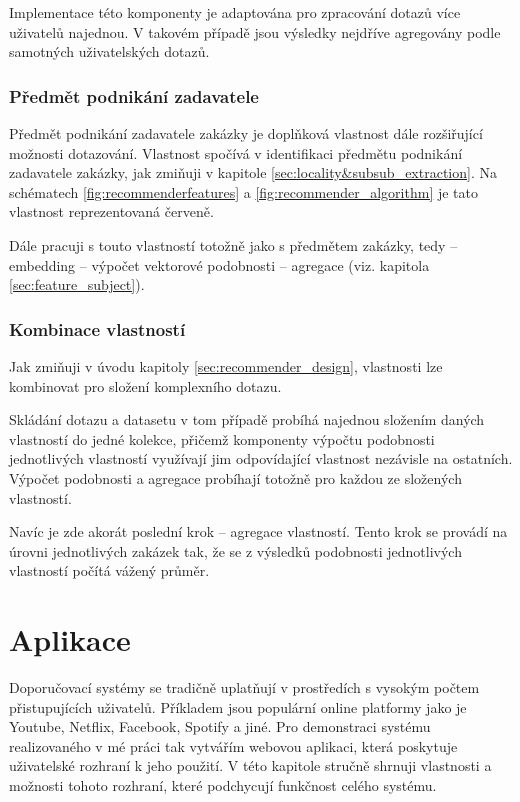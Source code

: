 \documentclass[thesis=M,czech]{FITthesis}[2019/12/23]
\begin{document}
Implementace této komponenty je adaptována pro zpracování dotazů více uživatelů najednou. V takovém případě jsou výsledky nejdříve agregovány podle samotných uživatelských dotazů.


\subsection{Předmět podnikání zadavatele}
\label{sec:feature_entity_subject}

Předmět podnikání zadavatele zakázky je doplňková vlastnost dále rozšiřující možnosti dotazování. Vlastnost spočívá v identifikaci předmětu podnikání zadavatele zakázky, jak zmiňuji v kapitole \ref{sec:locality&subsub_extraction}. Na schématech \ref{fig:recommenderfeatures} a \ref{fig:recommender_algorithm} je tato vlastnost reprezentovaná červeně.

Dále pracuji s touto vlastností totožně jako s předmětem zakázky, tedy -- embedding -- výpočet vektorové podobnosti -- agregace (viz. kapitola \ref{sec:feature_subject}).


\subsection{Kombinace vlastností}

Jak zmiňuji v úvodu kapitoly \ref{sec:recommender_design}, vlastnosti lze kombinovat pro složení komplexního dotazu.

Skládání dotazu a datasetu v tom případě probíhá najednou složením daných vlastností do jedné kolekce, přičemž komponenty výpočtu podobnosti jednotlivých vlastností využívají jim odpovídající vlastnost nezávisle na ostatních. Výpočet podobnosti a agregace probíhají totožně pro každou ze složených vlastností.

Navíc je zde akorát poslední krok -- agregace vlastností. Tento krok se provádí na úrovni jednotlivých zakázek tak, že se z výsledků podobnosti jednotlivých vlastností počítá vážený průměr.


\chapter{Aplikace}

Doporučovací systémy se tradičně uplatňují v prostředích s vysokým počtem přistupujících uživatelů. Příkladem jsou populární online platformy jako je Youtube, Netflix, Facebook, Spotify a jiné. Pro demonstraci systému realizovaného v mé práci tak vytvářím webovou aplikaci, která poskytuje uživatelské rozhraní k jeho použití. V této kapitole stručně shrnuji vlastnosti a možnosti tohoto rozhraní, které podchycují funkčnost celého systému.
\end{document}
